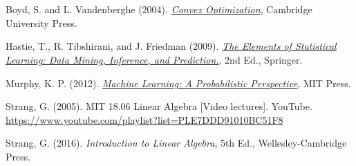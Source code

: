\documentclass[11pt]{article}
\theoremstyle{plain}
\theoremstyle{definition}
\theoremstyle{remark}
\numberwithin{equation}{section}
\begin{document}






















\

\

\begin{thebibliography}{9}

 Boyd, S. and L. Vandenberghe (2004). \textit{\href{https://web.stanford.edu/~boyd/cvxbook/}{Convex Optimization}}, Cambridge University Press.

 Hastie, T., R. Tibshirani, and J. Friedman (2009). \textit{\href{https://web.stanford.edu/~hastie/ElemStatLearn/}{The Elements of Statistical Learning: Data Mining, Inference, and Prediction.}}, 2nd Ed., Springer.

 Murphy, K. P. (2012). \textit{\href{https://probml.github.io/pml-book/book0.html}{Machine Learning: A Probabilistic Perspective}}, MIT Press.

 Strang, G. (2005). MIT 18.06 Linear Algebra [Video lectures]. YouTube. \\
\href{https://www.youtube.com/playlist?list=PLE7DDD91010BC51F8}{https://www.youtube.com/playlist?list=PLE7DDD91010BC51F8}

 Strang, G. (2016). \textit{Introduction to Linear Algebra}, 5th Ed., Wellesley-Cambridge Press.

\end{thebibliography}
\end{document}
